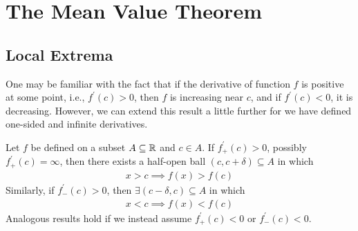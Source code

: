 \documentclass[thmcnt=section, 12pt]{my-elegantbook}
\begin{document}

\section{The Mean Value Theorem}


\subsection{Local Extrema}

\par One may be familiar with the fact that if the derivative of function $f$ is positive at some point, i.e., $f^\prime(c) > 0$, then $f$ is increasing near $c$, and if $f^\prime(c) < 0$, it is decreasing. However, we can extend this result a little further for we have defined one-sided and infinite derivatives.

\begin{theorem} \label{thm:14}
    Let $f$ be defined on a subset $A \subseteq \mathbb{R}$ and $c \in A$. If $f^\prime_+(c) > 0$, possibly $f^\prime_+(c) = \infty$, then there exists a half-open ball $(c, c+\delta) \subseteq A$ in which
    \begin{align}
        x > c \implies f(x) > f(c)
        \label{eq:12}
    \end{align}
    Similarly, if $f^\prime_{-}(c) > 0$, then $\exists (c-\delta, c) \subseteq A$ in which
    \begin{align*}
        x < c \implies f(x) < f(c)
    \end{align*}
    Analogous results hold if we instead assume $f^\prime_{+}(c) < 0$ or $f^\prime_{-}(c) < 0$.
\end{theorem}
\end{document}
